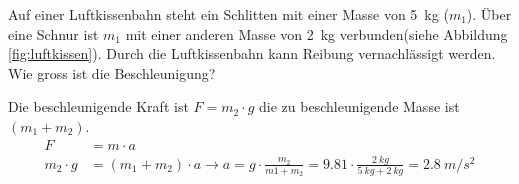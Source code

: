 \begin{aufgabe}
	Auf einer Luftkissenbahn steht ein Schlitten mit einer Masse von \SI{5}{kg} ($m_1$). Über eine Schnur ist $m_1$ mit einer anderen Masse
	von \SI{2}{kg} verbunden(siehe Abbildung \ref{fig:luftkissen}).
	Durch die Luftkissenbahn kann Reibung vernachlässigt werden.
	Wie gross ist die Beschleunigung?
	\begin{loesung}
		Die beschleunigende Kraft ist $F=m_2\cdot g$ die zu beschleunigende Masse ist $(m_1 +m_2)$.
		\begin{align*}
			F&=m\cdot a\\
			m_2\cdot g &= (m_1+m_2)\cdot a \to a=g\cdot\frac{m_2}{m1+m_2}=\SI{9.81}\cdot\frac{\SI{2}{kg}}{\SI{5}{kg}+\SI{2}{kg}}=\SI{2.8}{m/s^2}
		\end{align*}
	\end{loesung}
\end{aufgabe}



